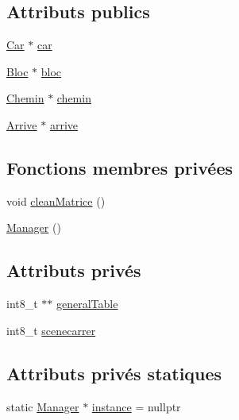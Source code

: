 \subsection*{Attributs publics}
\begin{DoxyCompactItemize}
\item 
\hyperlink{classCar}{Car} $\ast$ \hyperlink{classManager_a2803dff8e8f2912242f4098991d91415}{car}
\item 
\hyperlink{classBloc}{Bloc} $\ast$ \hyperlink{classManager_a66599bf2bd10c95b9fb7be9c333e0ff9}{bloc}
\item 
\hyperlink{classChemin}{Chemin} $\ast$ \hyperlink{classManager_abaeefec28074459f6dbdc64af9c6a3b9}{chemin}
\item 
\hyperlink{classArrive}{Arrive} $\ast$ \hyperlink{classManager_a6f99d8e25fc61a7fe0fdf160610b31cf}{arrive}
\end{DoxyCompactItemize}
\subsection*{Fonctions membres privées}
\begin{DoxyCompactItemize}
\item 
void \hyperlink{classManager_a11b091a748b391479ff45ae2895b831a}{clean\-Matrice} ()
\item 
\hyperlink{classManager_a1658ff9f18e38ccd9cb8b0b371b9c20b}{Manager} ()
\end{DoxyCompactItemize}
\subsection*{Attributs privés}
\begin{DoxyCompactItemize}
\item 
int8\-\_\-t $\ast$$\ast$ \hyperlink{classManager_ad5d59f4a2b1de265115f4efbbbc60dcd}{general\-Table}
\item 
int8\-\_\-t \hyperlink{classManager_a5198eb1550a9045c89c24269a34f405a}{scenecarrer}
\end{DoxyCompactItemize}
\subsection*{Attributs privés statiques}
\begin{DoxyCompactItemize}
\item 
static \hyperlink{classManager}{Manager} $\ast$ \hyperlink{classManager_ac80f5ee151565f111593921bac645ad7}{instance} = nullptr
\end{DoxyCompactItemize}


